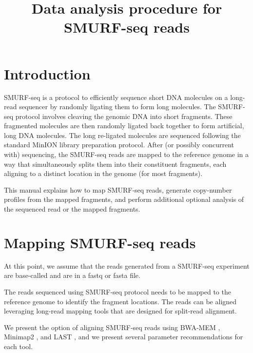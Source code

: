 \documentclass[11pt]{article}
\title{Data analysis procedure for SMURF-seq reads}
\date{}
\begin{document}
\maketitle
\tableofcontents

\newpage
\section{Introduction}
SMURF-seq is a protocol to efficiently sequence short DNA molecules on 
a long-read sequencer by randomly ligating them to form 
long molecules.
%
The SMURF-seq protocol involves cleaving the genomic DNA into short
fragments. These fragmented molecules are then randomly ligated back
together to form artificial, long DNA molecules. The long re-ligated
molecules are sequenced following the standard MinION library
preparation protocol. After (or possibly concurrent with) sequencing,
the SMURF-seq reads are mapped to the reference genome in a way that
simultaneously splits them into their constituent fragments, each
aligning to a distinct location in the genome (for most fragments).

%
This manual explains how to map SMURF-seq reads, generate copy-number profiles
from the mapped fragments, and perform additional optional analysis of the
sequenced read or the mapped fragments.



\section{Mapping SMURF-seq reads}
At this point, we assume that the reads generated from a 
SMURF-seq experiment are base-called and are in a fastq or
fasta file.

The reads sequenced using SMURF-seq protocol needs to be mapped to the 
reference genome to identify the fragment locations. The reads can be
aligned leveraging long-read mapping tools that are designed for split-read
alignment. 

We present the option of aligning SMURF-seq reads using BWA-MEM 
\cite{li2013aligning}, Minimap2 \cite{li2018minimap2}, and LAST
\cite{kielbasa2011adaptive}, and we present several parameter 
recommendations for each tool.
 
\end{document}
